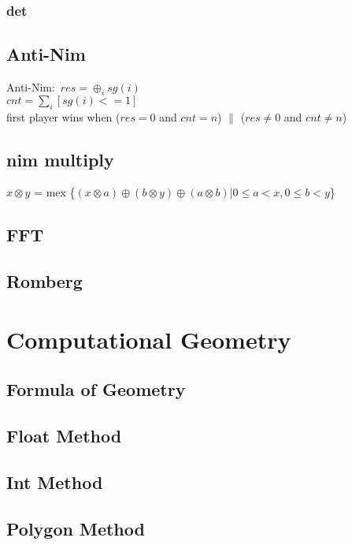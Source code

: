 \documentclass[a4paper,5pt,twocolumn,titlepage]{article}
\begin{document}
\begin{CJK*}{GBK}{song}
        \subsubsection{det}
            
       \subsection{Anti-Nim}
       Anti-Nim:\
    $res = \oplus _{i} sg(i)$ \\
    $cnt  = \sum_{i} [sg(i) <= 1]$\\
    first player wins when ($res = 0$ and $cnt = n$) $\parallel$ ($res \neq 0$ and $ cnt \neq n$)
       \subsection{nim multiply}
        $x \otimes y$ = mex \{$(x \otimes a) \oplus (b \otimes y) \oplus (a \otimes b)|0 \leq a < x, 0 \leq b < y$\}
        
    \subsection{FFT}
        
    \subsection{Romberg}
        
\section{Computational Geometry}
\subsection{Formula of Geometry}

\subsection{Float Method}

\subsection{Int Method}

\subsection{Polygon Method}


\end{CJK*}
\end{document}
